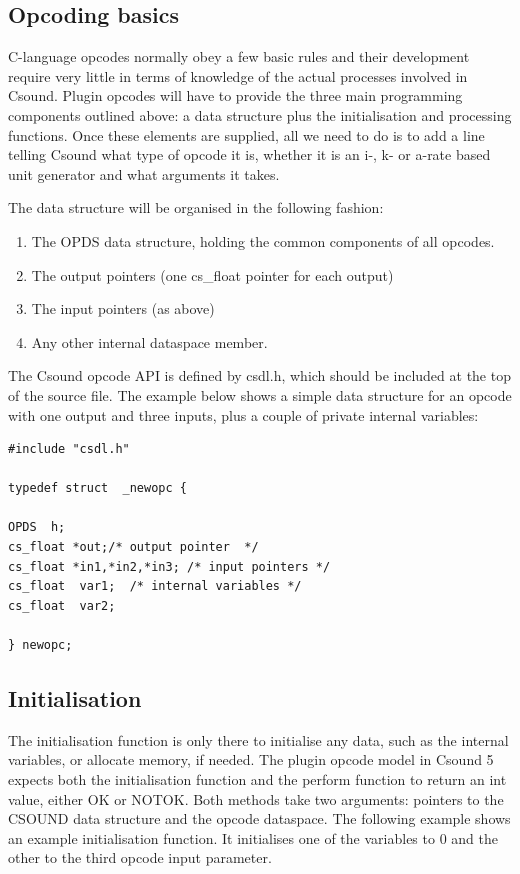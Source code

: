 \documentclass[11pt]{article}
\begin{document}
\subsection {Opcoding basics}
C-language opcodes normally obey a few basic rules and their development require very little in terms of knowledge of the actual processes involved in Csound. Plugin opcodes will have to provide the three main programming components outlined above: a data structure plus the initialisation and processing functions. Once these elements are supplied, all we need to do is to add a line telling Csound what type of opcode it is, whether it is an i-, k- or a-rate based unit generator and what arguments it takes. 

The data structure will be organised in the following fashion:

\begin{enumerate}

\item	The OPDS data structure, holding the common components of all opcodes.
\item	The output pointers (one cs_float pointer for each output)
\item	The input pointers (as above)
\item	Any other internal dataspace member.


\end{enumerate}



The Csound opcode API is defined by csdl.h, which should be included at the top of the source file. The example below shows a simple data structure for an opcode with one output and three inputs, plus a couple of private internal variables:

\begin{lstlisting}
#include "csdl.h"

typedef struct  _newopc {

OPDS  h;
cs_float *out;/* output pointer  */
cs_float *in1,*in2,*in3; /* input pointers */
cs_float  var1;  /* internal variables */
cs_float  var2;

} newopc;
\end{lstlisting}

\subsection{Initialisation}

The initialisation function is only there to initialise any data, such as the internal variables, or allocate memory, if needed. The plugin opcode model in Csound 5 expects both the initialisation function and the perform function to return an int value, either OK or NOTOK. Both methods  take two arguments:  pointers to the CSOUND data structure and the opcode dataspace. The following example shows an example initialisation function. It initialises one of the variables to 0 and the other to the third opcode input parameter.
\end{document}
